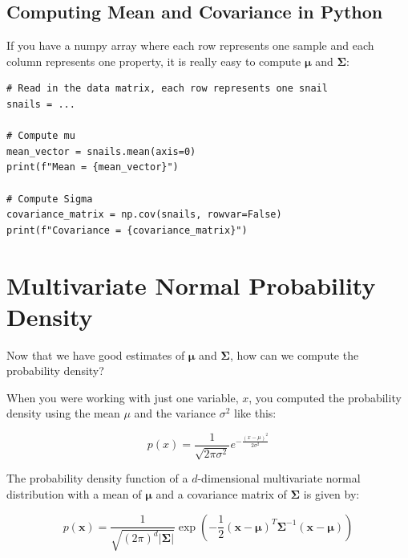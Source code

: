 \subsection{Computing Mean and Covariance in Python}

If you have a numpy array where each row represents one sample and each column represents one property, it is really easy to compute $\boldsymbol\mu$ and $\mathbf{\Sigma}$:

\begin{verbatim}
# Read in the data matrix, each row represents one snail
snails = ...

# Compute mu
mean_vector = snails.mean(axis=0)
print(f"Mean = {mean_vector}")

# Compute Sigma
covariance_matrix = np.cov(snails, rowvar=False)
print(f"Covariance = {covariance_matrix}")
\end{verbatim}

\section{Multivariate Normal Probability Density}

Now that we have good estimates of $\boldsymbol\mu$ and $\mathbf{\Sigma}$, how can we compute the probability density?

When you were working with just one variable, $x$, you computed the probability density using the mean $\mu$ and the variance $\sigma^2$ like this:

\begin{equation*}
p(x) = \frac{1}{\sqrt{2\pi\sigma^2}} e^{-\frac{(x - \mu)^2}{2\sigma^2}}
\end{equation*}

The probability density function of a $d$-dimensional
multivariate normal distribution with a mean of $\boldsymbol\mu$ and a covariance matrix of $\mathbf{\Sigma}$ is given by:

\begin{equation*}
p(\mathbf{x}) = \frac{1}{\sqrt{(2\pi)^d|\mathbf{\Sigma}|}}\exp\left(-\frac{1}{2}(\mathbf{x}-\boldsymbol\mu)^T\mathbf{\Sigma}^{-1}(\mathbf{x}-\boldsymbol\mu)\right)
\end{equation*}

